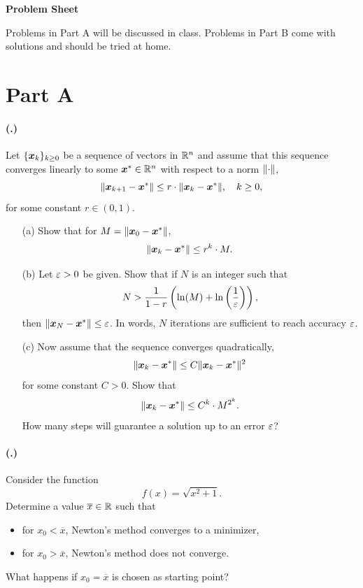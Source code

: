 \documentclass{article}
\newcounter{problemSheetNumber}
\newcounter{problems}
\renewcommand{\problem}{\paragraph{(\theproblemSheetNumber.\theproblems)}\addtocounter{problems}{1}}
\begin{document}
 
\begin{center}
{\Large {\bf Problem Sheet \theproblemSheetNumber}}
\end{center}

Problems in Part A will be discussed in class.
Problems in Part B come with solutions and should be tried at home. 


\section*{Part A}

\problem Let $\{\bm{x}_k\}_{k\geq 0}$ be a sequence of vectors in $\mathbb{R}^n$ and assume that this sequence converges linearly to some $\bm{x}^*\in \mathbb{R}^n$ with respect to a norm $\Vert {\cdot}\Vert$,
\begin{equation*}
 \Vert {\bm{x}_{k+1}-\bm{x}^*}\Vert \leq r\cdot \Vert {\bm{x}_k-\bm{x}^*}\Vert, \quad k\geq 0,
\end{equation*}
for some constant $r\in (0,1)$. 
\begin{itemize}
 \item[(a)] Show that for $M=\Vert {\bm{x}_0-\bm{x}^*}\Vert$, 
 \begin{equation*}
  \Vert {\bm{x}_k-\bm{x}^*}\Vert \leq r^k \cdot M.
 \end{equation*}
\item[(b)] Let $\varepsilon>0$ be given. Show that if $N$ is an integer such that
\begin{equation*}
 N> \frac{1}{1-r}\left(\ln(M)+\ln\left(\frac{1}{\varepsilon}\right)\right),
\end{equation*}
then $\Vert {\bm{x}_N-\bm{x}^*}\Vert\leq \varepsilon$. In words, $N$ iterations are sufficient to reach accuracy $\varepsilon$.
\item[(c)] Now assume that the sequence converges quadratically,
\begin{equation*}
 \Vert {\bm{x}_k-\bm{x}^*}\Vert\leq C\Vert {\bm{x}_k-\bm{x}^*}\Vert^2
\end{equation*}
for some constant $C>0$. Show that
\begin{equation*}
 \Vert {\bm{x}_k-\bm{x}^*}\Vert\leq C^k \cdot M^{2^k}.
\end{equation*}
How many steps will guarantee a solution up to an error $\varepsilon$?
\end{itemize}

 \problem Consider the function
 \begin{equation*}
  f(x) = \sqrt{x^2+1}.
 \end{equation*}
Determine a value $\overline{x}\in \mathbb{R}$ such that
\begin{itemize}
 \item for $x_0<\overline{x}$, Newton's method converges to a minimizer,
 \item for $x_0>\overline{x}$, Newton's method does not converge.
\end{itemize}
What happens if $x_0=\overline{x}$ is chosen as starting point?
 
\end{document}
